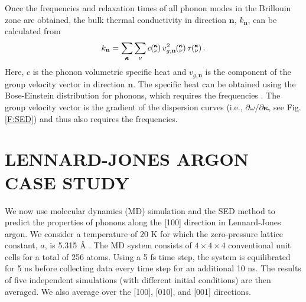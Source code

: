 \documentclass[twocolumn,10pt]{asme2e}
\newcommand{\kv}{\mspace{-4.0mu}\left(\mspace{-8.0mu}\begin{smallmatrix}&\pmb{\kappa} \\&\nu\end{smallmatrix}\mspace{-3.0mu}\right)}
\begin{document}
Once the frequencies and relaxation times of all phonon modes in the
Brillouin zone are obtained, the bulk thermal conductivity in direction
$\mathbf{n}$, $k_{\mathbf{n}}$, can be calculated from
\begin{equation}
	\label{E-size:k_bulk}
	k_{\mathbf{n}}=\sum_{\pmb{\kappa}} \sum_\nu c \kv v^{2}_{g,\mathbf{n}} \kv \tau \kv.
\end{equation}
Here, $c$ is the phonon volumetric specific heat and ${v}_{g,\mathbf{n}}$ is
the component of the group velocity vector in direction $\mathbf{n}$. The
specific heat can be obtained using the Bose-Einstein distribution for
phonons, which requires the frequencies \cite{srivastava1990}. The group
velocity vector is the gradient of the dispersion curves (i.e., $\partial
\omega /
\partial \pmb{\kappa}$, see Fig. \ref{F:SED}) and thus also requires the frequencies.

\section*{LENNARD-JONES ARGON CASE STUDY}\label{S:Case_study}

We now use molecular dynamics (MD) simulation and the SED method to predict
the properties of phonons along the [100] direction in Lennard-Jones argon.
We consider a temperature of 20 K for which the zero-pressure lattice
constant, $a$, is 5.315 {\AA} \cite{mcgaughey2004c}.  The MD system consists
of $4\times 4\times 4$ conventional unit cells for a total of 256 atoms.
Using a 5 fs time step, the system is equilibrated for 5 ns before collecting
data every time step for an additional 10 ns.  The results of five
independent simulations (with different initial conditions) are then
averaged.  We also average over the [100], [010], and [001] directions.
\end{document}
